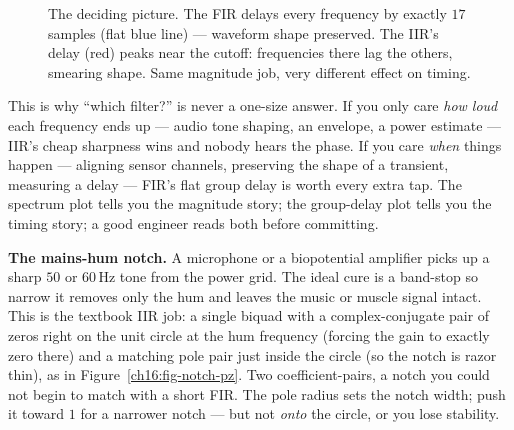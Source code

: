 \begin{figure}[H]
\centering
{}
\caption{The deciding picture. The FIR delays every frequency by exactly $17$
samples (flat blue line) --- waveform shape preserved. The IIR's delay (red)
peaks near the cutoff: frequencies there lag the others, smearing shape. Same
magnitude job, very different effect on timing.}
\label{ch16:fig-groupdelay}
\end{figure}

\begin{aestheticbox}
This is why ``which filter?'' is never a one-size answer. If you only care
\emph{how loud} each frequency ends up --- audio tone shaping, an envelope, a power
estimate --- IIR's cheap sharpness wins and nobody hears the phase. If you care
\emph{when} things happen --- aligning sensor channels, preserving the shape of a
transient, measuring a delay --- FIR's flat group delay is worth every extra tap.
The spectrum plot tells you the magnitude story; the group-delay plot tells you the
timing story; a good engineer reads both before committing.
\end{aestheticbox}

\begin{applicationbox}
\textbf{The mains-hum notch.} A microphone or a biopotential amplifier picks up a
sharp $50$ or $60$\,Hz tone from the power grid. The ideal cure is a band-stop so
narrow it removes only the hum and leaves the music or muscle signal intact. This
is the textbook IIR job: a single biquad with a complex-conjugate pair of zeros
right on the unit circle at the hum frequency (forcing the gain to exactly zero
there) and a matching pole pair just inside the circle (so the notch is razor
thin), as in Figure~\ref{ch16:fig-notch-pz}. Two coefficient-pairs, a notch you
could not begin to match with a short FIR. The pole radius sets the notch width; push it toward $1$ for a narrower notch
--- but not \emph{onto} the circle, or you lose stability.
\end{applicationbox}

